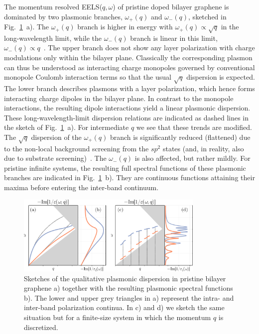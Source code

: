 The momentum resolved EELS($q, \omega$) of pristine doped bilayer graphene is dominated by two plasmonic branches, $\omega_+(q)$ and $\omega_-(q)$, sketched in Fig.~\ref{fig:mat22:BLGDispersion}~a). The $\omega_+(q)$ branch is higher in energy with $\omega_+(q) \propto \sqrt{q}$ in the long-wavelength limit, while the $\omega_-(q)$ branch is linear in this limit, $\omega_-(q) \propto q$~\cite{hwang_dielectric_2007,hwang_plasmon_2009,roldan_dielectric_2013}. The upper branch does not show any layer polarization with charge modulations only within the bilayer plane. Classically the corresponding plasmon can thus be understood as interacting charge monopoles governed by conventional monopole Coulomb interaction terms so that the usual $\sqrt{q}$ dispersion is expected. The lower branch describes plasmons with a layer polarization, which hence forms interacting charge dipoles in the bilayer plane. In contrast to the monopole interactions, the resulting dipole interactions yield a linear plasmonic dispersion. These long-wavelength-limit dispersion relations are indicated as dashed lines in the sketch of Fig.~\ref{fig:mat22:BLGDispersion}~a). For intermediate $q$ we see that these trends are modified. The $\sqrt{q}$ dispersion of the $\omega_+(q)$ branch is significantly reduced (flattened) due to the non-local background screening from the $sp^2$ states (and, in reality, also due to substrate screening)~\cite{da_jornada_universal_2020,jiang_plasmonic_2021}. The $\omega_-(q)$ is also affected, but rather mildly. For pristine infinite systems, the resulting full spectral functions of these plasmonic branches are indicated in Fig.~\ref{fig:mat22:BLGDispersion}~b). They are continuous functions attaining their maxima before entering the inter-band continuum.
        
\begin{figure}
    \centering
    \includegraphics[width=0.8\textwidth]{handmade/Figure_4.pdf}
    \caption{Sketches of the qualitative plasmonic dispersion in pristine bilayer graphene a) together with the resulting plasmonic spectral functions b). The lower and upper grey triangles in a) represent the intra- and inter-band polarization continua. In c) and d) we sketch the same situation but for a finite-size system in which the momentum $q$ is discretized. \label{fig:mat22:BLGDispersion}}
\end{figure}

